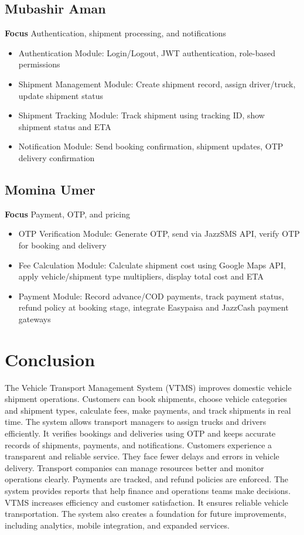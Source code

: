 \documentclass[12pt,a4paper]{article}
\begin{document}
\subsection{Mubashir Aman}
\textbf{Focus} Authentication, shipment processing, and notifications
\begin{itemize}
    \item Authentication Module: Login/Logout, JWT authentication, role-based permissions
  \item Shipment Management Module: Create shipment record, assign driver/truck, update shipment status
  \item Shipment Tracking Module: Track shipment using tracking ID, show shipment status and ETA
\item Notification Module: Send booking confirmation, shipment updates, OTP delivery confirmation

\end{itemize}

\subsection{Momina Umer}
\textbf{Focus} Payment, OTP, and pricing
\begin{itemize}
    \item OTP Verification Module: Generate OTP, send via JazzSMS API, verify OTP for booking and delivery
 \item Fee Calculation Module: Calculate shipment cost using Google Maps API, apply vehicle/shipment type multipliers, display total cost and ETA
 \item Payment Module: Record advance/COD payments, track payment status, refund policy at booking stage, integrate Easypaisa and JazzCash payment gateways

\end{itemize}



\section{Conclusion}
The Vehicle Transport Management System (VTMS) improves domestic vehicle shipment operations. Customers can book shipments, choose vehicle categories and shipment types, calculate fees, make payments, and track shipments in real time. The system allows transport managers to assign trucks and drivers efficiently. It verifies bookings and deliveries using OTP and keeps accurate records of shipments, payments, and notifications.
Customers experience a transparent and reliable service. They face fewer delays and errors in vehicle delivery. Transport companies can manage resources better and monitor operations clearly. Payments are tracked, and refund policies are enforced. The system provides reports that help finance and operations teams make decisions.
VTMS increases efficiency and customer satisfaction. It ensures reliable vehicle transportation. The system also creates a foundation for future improvements, including analytics, mobile integration, and expanded services.
\end{document}
